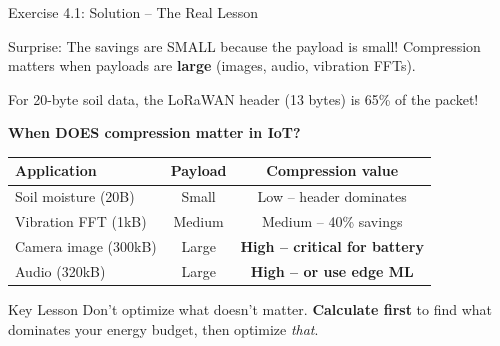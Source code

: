 \documentclass[aspectratio=169,11pt]{beamer}
\begin{document}
\begin{frame}{Exercise 4.1: Solution -- The Real Lesson}
    \begin{alertblock}{Surprise: The savings are SMALL because the payload is small!}
        Compression matters when payloads are \textbf{large} (images, audio, vibration FFTs).
        
        For 20-byte soil data, the LoRaWAN header (13 bytes) is 65\% of the packet!
    \end{alertblock}
    
    \vspace{0.3cm}
    \textbf{When DOES compression matter in IoT?}
    
    \begin{center}
    \begin{tabular}{lcc}
        \toprule
        \textbf{Application} & \textbf{Payload} & \textbf{Compression value} \\
        \midrule
        Soil moisture (20B) & Small & Low -- header dominates \\
        Vibration FFT (1kB) & Medium & Medium -- 40\% savings \\
        Camera image (300kB) & Large & \textbf{High -- critical for battery} \\
        Audio (320kB) & Large & \textbf{High -- or use edge ML} \\
        \bottomrule
    \end{tabular}
    \end{center}
    
    \vspace{0.2cm}
    \begin{block}{Key Lesson}
        Don't optimize what doesn't matter. \textbf{Calculate first} to find what dominates your energy budget, then optimize \textit{that}.
    \end{block}
\end{frame}
\end{document}
